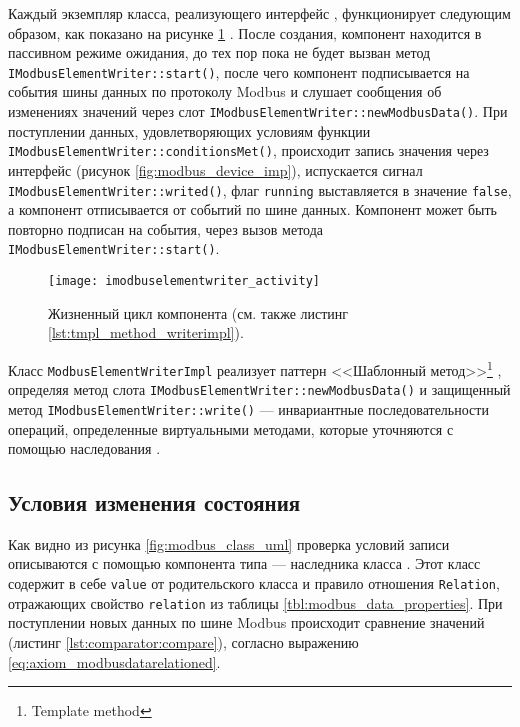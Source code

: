 Каждый экземпляр класса, реализующего интерфейс \mbwriter,
функционирует следующим образом, как показано на рисунке \ref{fig:imodbuselementwriter_activity} \cite[стр. 217]{book:oop:oop_analize}.
После создания, компонент находится в пассивном режиме ожидания, до тех пор пока не будет вызван
метод \texttt{IModbusElementWriter::start()}, после чего компонент подписывается на события шины данных по протоколу Modbus
и слушает сообщения об изменениях значений через слот \texttt{IModbusElementWriter::newModbusData()}.
При поступлении данных, удовлетворяющих условиям функции \texttt{IModbusElementWri\-ter::con\-di\-tions\-Met()},
происходит запись значения через интерфейс \mbdevice (рисунок \ref{fig:modbus_device_imp}),
испускается сигнал \texttt{IModbus\-Ele\-ment\-Writer::writed()},
флаг \texttt{running} выставляется в значение \texttt{false},
а компонент отписывается от событий по шине данных.
Компонент может быть повторно подписан на события, через вызов метода \texttt{IModbusElementWriter::start()}.


\begin{figure}\begin{center}
    \texttt{[image: imodbuselementwriter\_activity]}
    \caption[Жизненный цикл компонента \mbwriter]%
        {Жизненный цикл компонента \mbwriter (см. также листинг \ref{lst:tmpl_method_writerimpl}).}%
            \label{fig:imodbuselementwriter_activity}
\end{center}\end{figure}



Класс \texttt{ModbusElementWriterImpl} реализует паттерн <<Шаблонный метод>>\footnote{Template method} \cite[стр. 309]{book:pattern:band_of_4},
определяя метод слота \texttt{IModbusElement\-Writer::new\-Modbus\-Data()}
и защищенный метод \texttt{IModbus\-Element\-Writer::wri\-te()} --- инвариантные последовательности операций,
определенные виртуальными методами, которые уточняются с помощью наследования \cite[стр. 170]{book:tdd:KentBeck}.




\subsection{Условия изменения состояния}
Как видно из рисунка \ref{fig:modbus_class_uml} проверка условий записи описываются с помощью компонента типа
\mbrelationed --- наследника класса \mbdata.
Этот класс содержит в себе \texttt{value} от родительского класса и правило отношения \texttt{Relation},
отражающих свойство \texttt{relation} из таблицы \ref{tbl:modbus_data_properties}.
При поступлении новых данных по шине Modbus происходит сравнение значений (листинг \ref{lst:comparator:compare}),
согласно выражению \eqref{eq:axiom_modbusdatarelationed}.



